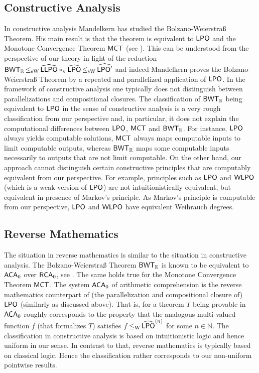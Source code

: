 \documentclass[a4paper]{amsart}
\def\IN{{\mathbb{N}}}
\def\IR{{\mathbb{R}}}
\def\LPO{\text{\rm\sffamily LPO}}
\def\LLPO{\text{\rm\sffamily LLPO}}
\def\RCA{\text{\rm\sffamily RCA}}
\def\ACA{\text{\rm\sffamily ACA}}
\def\BWT{\text{\rm\sffamily BWT}}
\def\LPO{\mbox{\rm\sffamily LPO}}
\def\LLPO{\mbox{\rm\sffamily LLPO}}
\def\WLPO{\text{\rm\sffamily WLPO}}
\def\MCT{\text{\rm\sffamily MCT}}
\def\leqW{\mathop{\leq_{\mathrm{W}}}}
\def\leqSW{\mathop{\leq_{\mathrm{sW}}}}
\def\stars{*_{\rm s}\;\!}
\theoremstyle{definition}
\begin{document}
\subsection{Constructive Analysis}

In constructive analysis Mandelkern has studied the Bolzano-Weierstra\ss{} Theorem.
His main result is that the theorem is equivalent to $\LPO$ and the Monotone Convergence
Theorem $\MCT$ (see \cite{Man88a,Ish04}). This can be understood from the perspective of our theory in light
of the reduction
$\BWT_\IR\leqSW\widehat{\LLPO}\stars\widehat{\LPO}\leqSW\widehat{\LPO'}$
and indeed Mandelkern proves the Bolzano-Weierstra\ss{} Theorem by a repeated
and parallelized application of $\LPO$.
In the framework of constructive analysis one typically does not distinguish between parallelizations and 
compositional closures. 
The classification of $\BWT_\IR$ being equivalent to $\LPO$ in the sense
of constructive analysis is a very rough classification from our perspective and, 
in particular, it does not explain the computational differences between $\LPO$, $\MCT$
and $\BWT_\IR$. For instance, $\LPO$ always yields computable solutions, $\MCT$ always
maps computable inputs to limit computable outputs, whereas $\BWT_\IR$ maps
some computable inputs necessarily to outputs that are not limit computable.
On the other hand, our approach cannot distinguish certain constructive principles
that are computably equivalent from our perspective.
For example, principles such as $\LPO$ and $\WLPO$ (which is a weak version of $\LPO$) 
are not intuitionistically equivalent, but equivalent in presence of Markov's principle.
As Markov's principle is computable from our perspective, $\LPO$ and $\WLPO$
have equivalent Weihrauch degrees.

\subsection{Reverse Mathematics}

The situation in reverse mathematics is similar to the situation in constructive analysis.
The Bolzano-Weierstra\ss{} Theorem $\BWT_\IR$ is known to be equivalent to $\ACA_0$
over $\RCA_0$, see \cite{Sim99}. The same holds true for the Monotone Convergence Theorem $\MCT$.
The system $\ACA_0$ of arithmetic comprehension is the reverse mathematics counterpart of 
(the parallelization and compositional closure of) $\LPO$ (similarly as discussed above).
That is, for a theorem $T$ being provable in $\ACA_0$ roughly corresponds to
the property that the analogous multi-valued function $f$ (that formalizes $T$) satisfies $f\leqW\widehat{\LPO}^{(n)}$ for some $n\in\IN$.
The classification in constructive analysis is based on intuitionistic logic and hence
uniform in our sense. In contrast to that, reverse mathematics is typically based
on classical logic. Hence the classification rather corresponds to our non-uniform pointwise
results.
\end{document}
